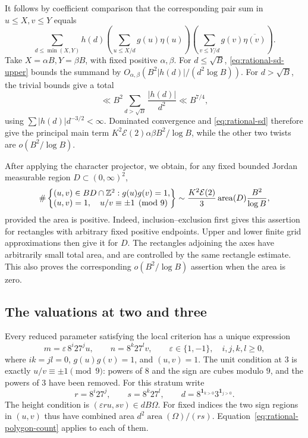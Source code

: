 It follows by coefficient comparison that the corresponding pair sum in
\(u\le X,v\le Y\) equals
\[
 \sum_{d\le\min(X,Y)}h(d)
 \left(\sum_{u\le X/d}g(u)\eta(u)\right)
 \left(\sum_{v\le Y/d}g(v)\overline{\eta(v)}\right).
\]
Take \(X=\alpha B,Y=\beta B\), with fixed positive
\(\alpha,\beta\).  For \(d\le\sqrt B\),
\eqref{eq:rational-sd-upper} bounds the summand by
\(O_{\alpha,\beta}(B^2|h(d)|/(d^2\log B))\).
For \(d>\sqrt B\), the trivial bounds give a total
\[
 \ll B^2\sum_{d>\sqrt B}\frac{|h(d)|}{d^2}
 \ll B^{7/4},
\]
using \(\sum |h(d)|d^{-3/2}<\infty\).  Dominated convergence and
\eqref{eq:rational-sd} therefore give the principal main term
\(K^2\mathcal E(2)\alpha\beta B^2/\log B\), while the other two
twists are \(o(B^2/\log B)\).

After applying the character projector, we obtain, for any fixed bounded
Jordan measurable region \(D\subset(0,\infty)^2\),
\begin{equation}\label{eq:rational-polygon-count}
 \#\left\{\begin{array}{@{}l@{}}
 (u,v)\in BD\cap\Z^2:g(u)g(v)=1,\\
 (u,v)=1,\quad u/v\equiv\pm1\pmod9
 \end{array}\right\}
 \sim\frac{K^2\mathcal E(2)}3\operatorname{area}(D)
       \frac{B^2}{\log B},
\end{equation}
provided the area is positive.  Indeed, inclusion--exclusion first gives
this assertion for rectangles with arbitrary fixed positive endpoints.
Upper and lower finite grid approximations then give it for \(D\).
The rectangles adjoining the axes have arbitrarily small total area, and
are controlled by the same rectangle estimate.  This also proves the
corresponding \(o(B^2/\log B)\) assertion when the area is zero.

\subsection{The valuations at two and three}

Every reduced parameter satisfying the local criterion has a unique
expression
\[
 m=\varepsilon\,8^i27^j u,\qquad
 n=8^k27^l v,
 \qquad \varepsilon\in\{1,-1\},\quad i,j,k,l\ge0,
\]
where \(ik=jl=0\), \(g(u)g(v)=1\), and \((u,v)=1\).
The unit condition at \(3\) is exactly
\(u/v\equiv\pm1\pmod9\): powers of \(8\) and the sign are cubes
modulo \(9\), and the powers of \(3\) have been removed.
For this stratum write
\[
 r=8^i27^j,\qquad s=8^k27^l,\qquad
 d=8^{\mathbf1_{k>0}}3^{\mathbf1_{j>0}}.
\]
The height condition is \((\varepsilon r u,s v)\in dB\Omega\).
For fixed indices the two sign regions in \((u,v)\) thus have combined
area \(d^2\operatorname{area}(\Omega)/(rs)\).
Equation~\eqref{eq:rational-polygon-count} applies to each of them.

